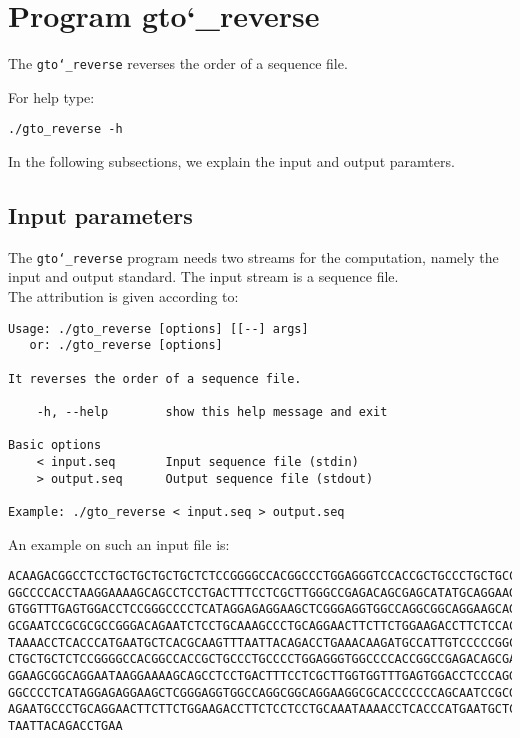\section{Program gto\char`_reverse}
The \texttt{gto\char`_reverse} reverses the order of a sequence file.

For help type:
\begin{lstlisting}
./gto_reverse -h
\end{lstlisting}
In the following subsections, we explain the input and output paramters.

\subsection*{Input parameters}

The \texttt{gto\char`_reverse} program needs two streams for the computation,
namely the input and output standard. The input stream is a sequence file.\\
The attribution is given according to:
\begin{lstlisting}
Usage: ./gto_reverse [options] [[--] args]
   or: ./gto_reverse [options]

It reverses the order of a sequence file.

    -h, --help        show this help message and exit

Basic options
    < input.seq       Input sequence file (stdin)
    > output.seq      Output sequence file (stdout)

Example: ./gto_reverse < input.seq > output.seq
\end{lstlisting}
An example on such an input file is:
\begin{lstlisting}
ACAAGACGGCCTCCTGCTGCTGCTGCTCTCCGGGGCCACGGCCCTGGAGGGTCCACCGCTGCCCTGCTGCCATTGTCCCC
GGCCCCACCTAAGGAAAAGCAGCCTCCTGACTTTCCTCGCTTGGGCCGAGACAGCGAGCATATGCAGGAAGCGGCAGGAA
GTGGTTTGAGTGGACCTCCGGGCCCCTCATAGGAGAGGAAGCTCGGGAGGTGGCCAGGCGGCAGGAAGCAGGCCAGTGCC
GCGAATCCGCGCGCCGGGACAGAATCTCCTGCAAAGCCCTGCAGGAACTTCTTCTGGAAGACCTTCTCCACCCCCCCAGC
TAAAACCTCACCCATGAATGCTCACGCAAGTTTAATTACAGACCTGAAACAAGATGCCATTGTCCCCCGGCCTCCTGCTG
CTGCTGCTCTCCGGGGCCACGGCCACCGCTGCCCTGCCCCTGGAGGGTGGCCCCACCGGCCGAGACAGCGAGCATATGCA
GGAAGCGGCAGGAATAAGGAAAAGCAGCCTCCTGACTTTCCTCGCTTGGTGGTTTGAGTGGACCTCCCAGGCCAGTGCCG
GGCCCCTCATAGGAGAGGAAGCTCGGGAGGTGGCCAGGCGGCAGGAAGGCGCACCCCCCCAGCAATCCGCGCGCCGGGAC
AGAATGCCCTGCAGGAACTTCTTCTGGAAGACCTTCTCCTCCTGCAAATAAAACCTCACCCATGAATGCTCACGCAAGTT
TAATTACAGACCTGAA
\end{lstlisting}


